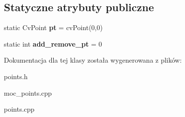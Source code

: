 \subsection*{Statyczne atrybuty publiczne}
\begin{DoxyCompactItemize}
\item 
\hypertarget{class_points2_a47f061a9802f8541f71ff3c805bd457f}{
static CvPoint {\bfseries pt} = cvPoint(0,0)}
\label{class_points2_a47f061a9802f8541f71ff3c805bd457f}

\item 
\hypertarget{class_points2_a27c9b3b569a0ac996490da0c6721408a}{
static int {\bfseries add\_\-remove\_\-pt} = 0}
\label{class_points2_a27c9b3b569a0ac996490da0c6721408a}

\end{DoxyCompactItemize}


Dokumentacja dla tej klasy została wygenerowana z plików:\begin{DoxyCompactItemize}
\item 
points.h\item 
moc\_\-points.cpp\item 
points.cpp\end{DoxyCompactItemize}
